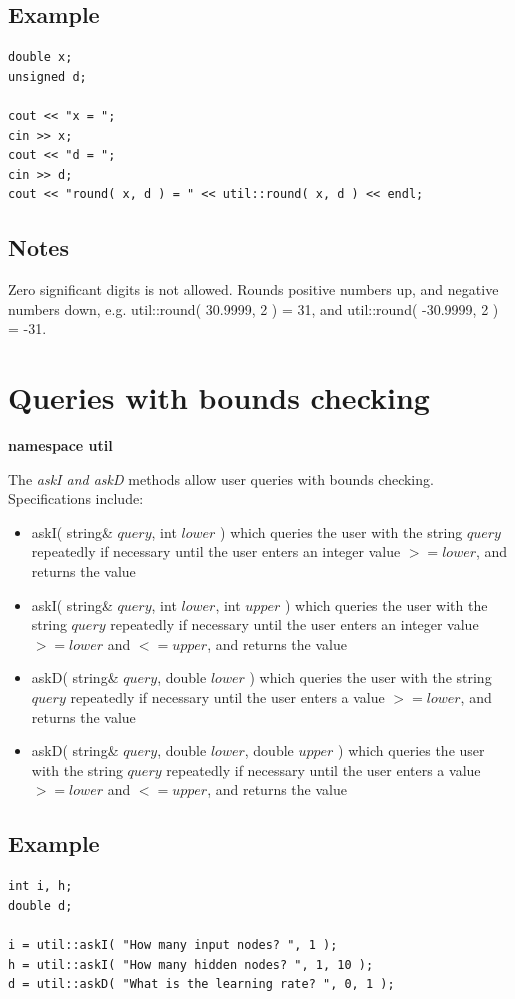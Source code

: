 \documentclass{report}
\begin{document}
\subsection{Example}
\begin{verbatim}
double x;
unsigned d;

cout << "x = ";
cin >> x;
cout << "d = ";
cin >> d;
cout << "round( x, d ) = " << util::round( x, d ) << endl;
\end{verbatim}

\subsection{Notes}
Zero significant digits is not allowed.  Rounds positive numbers up,
and negative numbers down, e.g. util::round( 30.9999, 2 ) = 31, and
util::round( -30.9999, 2 ) = -31.


\section{Queries with bounds checking}

{\bf namespace util}

The {\em askI and askD} methods allow user queries with bounds
checking.  Specifications include:

\begin{itemize}
\item askI( string\& $query$, int $lower$ ) which queries the user
      with the string $query$ repeatedly if necessary until the user
      enters an integer value $>= lower$, and returns the value
\item askI( string\& $query$, int $lower$, int $upper$ ) which queries
      the user with the string $query$ repeatedly if necessary until
      the user enters an integer value $>= lower$ and $<= upper$, and
      returns the value
\item askD( string\& $query$, double $lower$ ) which queries the user
      with the string $query$ repeatedly if necessary until the user
      enters a value $>= lower$, and returns the value
\item askD( string\& $query$, double $lower$, double $upper$ ) which
      queries the user with the string $query$ repeatedly if necessary
      until the user enters a value $>= lower$ and $<= upper$, and
      returns the value
\end{itemize}

\subsection{Example}
\begin{verbatim}
int i, h;
double d;

i = util::askI( "How many input nodes? ", 1 );
h = util::askI( "How many hidden nodes? ", 1, 10 );
d = util::askD( "What is the learning rate? ", 0, 1 );
\end{verbatim}
\end{document}
